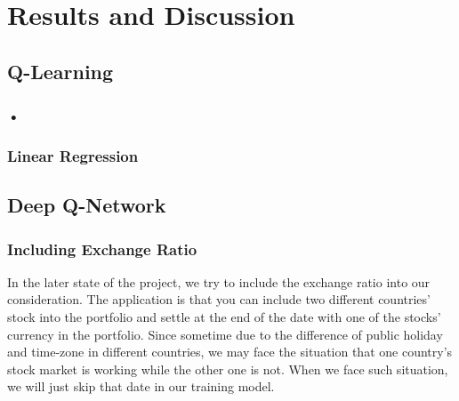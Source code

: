 \chapter{Results and Discussion}
\label{Ch:GivingCredit}

\section{Q-Learning}

\subsection{•}

\subsection{Linear Regression}

\section{Deep Q-Network}

\subsection{Including Exchange Ratio}
In the later state of the project, we try to include the exchange ratio into our consideration. The application is that you can include two different countries' stock into the portfolio and settle at the end of the date with one of the stocks' currency in the portfolio. Since sometime due to the difference of public holiday and time-zone in different countries, we may face the situation that one country's stock market is working while the other one is not. When we face such situation, we will just skip that date in our training model. 

\endinput
